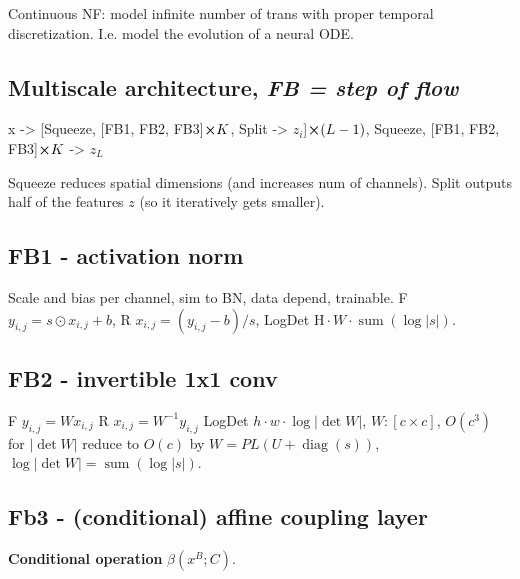 Continuous NF: model infinite number of trans with proper temporal discretization. I.e. model the evolution of a neural ODE.


\subsection*{Multiscale architecture, \textit{FB = step of flow}}

x -> [Squeeze, [FB1, FB2, FB3]$\cross K$,  Split -> $z_i$]$\cross (L-1)$, Squeeze, [FB1, FB2, FB3]$\cross K$ -> $z_L$

Squeeze reduces spatial dimensions (and increases num of channels). Split outputs half of the features $z$ (so it iteratively gets smaller).

\subsection*{FB1 - activation norm}
Scale and bias per channel, sim to BN, data depend, trainable.
\textsf{F} \( y_{i, j}={s} \odot x_{i, j}+{b}\),
\textsf{R} \( {x}_{i, j}=({y}_{i, j}-{b}) / {s}\),
\textsf{LogDet} \(\mathrm{H} \cdot W \cdot \operatorname{sum}(\log |s|)\).

\subsection*{FB2 - invertible 1x1 conv}

\textsf{F} \({y}_{i, j}={W} {x}_{i, j}\)
\textsf{R} \({x}_{i, j}={W}^{-1} {y}_{i, j}\)
\textsf{LogDet} \(h \cdot w \cdot \log |\operatorname{det}{W}|\), \({W}:[c \times c]\),
\(O(c^3)\) for \(|\operatorname{det}{W}|\)  reduce to \(O(c)\) by \({W}={P L}({U}+\operatorname{diag}({s}))\), \(\log |\operatorname{det}{W}|=\operatorname{sum}(\log |{s}|)\).


\subsection*{Fb3 - (conditional) affine coupling layer}

\textbf{Conditional operation} \(\beta(x^{B};C)\).


